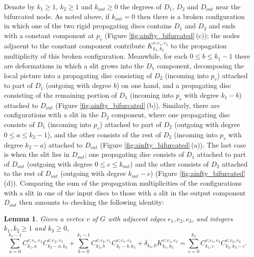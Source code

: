 \documentclass[11pt,leqno]{amsart}
\newtheorem{lemma}[theo]{Lemma}
\numberwithin{equation}{section}
\begin{document}
Denote by $k_1\geq 1$, $k_2\geq 1$ and $k_{out}\geq 0$ the degrees of $D_1$, $D_2$ and
$D_{out}$ near the bifurcated node. As noted above, if $k_{out}=0$ then
there is a broken configuration in which one of the two rigid propagating
discs contains $D_1$ and $D_2$ and ends with a constant component at $p_v$
(Figure \ref{fig:ainfty_bifurcated}\,(c)); the nodes adjacent to the constant component 
contribute $K^{v;e_1,e_2}_{k_1,k_2}$ to the propagation multiplicity of this broken configuration.
Meanwhile, for each $0\leq b\leq k_1-1$ there are
deformations in which a slit grows into the $D_1$ component, decomposing the
local picture into a propagating disc consisting of $D_2$ (incoming into
$p_v$) attached to part of $D_1$ (outgoing with degree $b$) on one hand, and
a propagating disc consisting of the remaining portion of $D_1$ (incoming
into $p_v$ with degree $k_1-b$) attached to $D_{out}$ (Figure \ref{fig:ainfty_bifurcated}\,(b)).
Similarly, there are configurations with a slit in the $D_2$ component,
where one propagating disc consists of $D_1$ (incoming into $p_v$) attached
to part of $D_2$ (outgoing with degree $0\leq a\leq k_2-1$), and the other
consists of the rest of $D_2$ (incoming into $p_v$ with degree $k_2-a$)
attached to $D_{out}$ (Figure \ref{fig:ainfty_bifurcated}\,(a)).
The last case is when the slit lies in $D_{out}$; one propagating disc
consists of $D_1$ attached to part of $D_{out}$ (outgoing with degree $0\leq
c\leq k_{out}$) and the other consists of $D_2$ attached to the rest of
$D_{out}$ (outgoing with degree $k_{out}-c$) (Figure
\ref{fig:ainfty_bifurcated}\,(d)). Comparing the sum of the propagation
multiplicities of the configurations with a slit in one of the input discs
to those with a slit in the output component $D_{out}$ then amounts to
checking the following identity:

\begin{lemma}\label{l:ainfty_tripod}
Given a vertex $v$ of $G$ with adjacent edges $e_1,e_2,e_3$, and
integers $k_1,k_2\geq 1$ and $k_3\geq 0$,
\begin{equation}\label{eq:ainfty_tripod}
\sum_{a=0}^{k_2-1} C_{k_1,a}^{v;e_1,e_2} C_{k_2-a,k_3}^{v;e_2,e_3}
+\sum_{b=0}^{k_1-1} C_{k_2,b}^{v;e_2,e_1} C_{k_1-b,k_3}^{v;e_1,e_3}
+\delta_{k_3,0}K_{k_1,k_2}^{v;e_1,e_2}=
\sum_{c=0}^{k_3} C_{k_1,c}^{v;e_1,e_3} C_{k_2,k_3-c}^{v;e_2,e_3}.
\end{equation}
\end{lemma}
\end{document}
